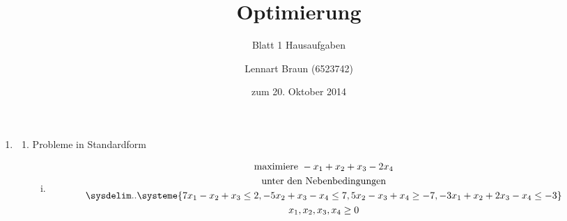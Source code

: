 \documentclass[a4paper]{scrartcl}
\title{Optimierung}
\subtitle{Blatt 1 Hausaufgaben}
\author{
	Lennart Braun (6523742) \\
}
\date{zum 20. Oktober 2014}
\begin{document}
\maketitle

\begin{enumerate}
    \item %
        \begin{enumerate}
            \item Probleme in Standardform
                \begin{enumerate}[(i)]
                    \item
                        \begin{equation}
                            \begin{gathered}
                                \text{maximiere } -x_1 + x_2 + x_3 - 2x_4 \\
                                \text{unter den Nebenbedingungen} \\
                                \sysdelim..\systeme{%
                                    7x_1 -x_2 +x_3 \leq 2,
                                    -5x_2 +x_3 -x_4 \leq 7,
                                    5x_2 -x_3 +x_4 \geq -7,
                                    -3x_1 +x_2 +2x_3 -x_4 \leq -3
                                } \\
                                x_1, x_2, x_3, x_4 \geq 0
                            \end{gathered}
                        \end{equation}
                        

\end{enumerate}
\end{enumerate}
\end{enumerate}
\end{document}
